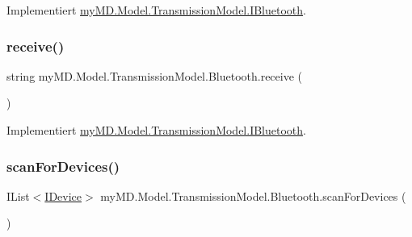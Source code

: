 Implementiert \mbox{\hyperlink{interfacemy_m_d_1_1_model_1_1_transmission_model_1_1_i_bluetooth_a8bb41d3ca3ff3264de397bccd555e8b8}{my\+M\+D.\+Model.\+Transmission\+Model.\+I\+Bluetooth}}.

\mbox{\label{classmy_m_d_1_1_model_1_1_transmission_model_1_1_bluetooth_aedbb2bbfe638eb5e83497c7b4e74d99d}} 
\subsubsection{\texorpdfstring{receive()}{receive()}}
{\footnotesize\ttfamily string my\+M\+D.\+Model.\+Transmission\+Model.\+Bluetooth.\+receive (\begin{DoxyParamCaption}{ }\end{DoxyParamCaption})}



Implementiert \mbox{\hyperlink{interfacemy_m_d_1_1_model_1_1_transmission_model_1_1_i_bluetooth_aa835ad437ee703e3ae74f43e09c28fbc}{my\+M\+D.\+Model.\+Transmission\+Model.\+I\+Bluetooth}}.

\mbox{\label{classmy_m_d_1_1_model_1_1_transmission_model_1_1_bluetooth_a551c99750193ce8a6fc03c92864d24e8}} 
\subsubsection{\texorpdfstring{scan\+For\+Devices()}{scanForDevices()}}
{\footnotesize\ttfamily I\+List$<$\mbox{\hyperlink{interfacemy_m_d_1_1_model_interface_1_1_transmission_model_interface_1_1_i_device}{I\+Device}}$>$ my\+M\+D.\+Model.\+Transmission\+Model.\+Bluetooth.\+scan\+For\+Devices (\begin{DoxyParamCaption}{ }\end{DoxyParamCaption})}



